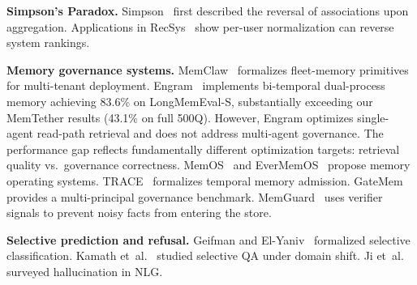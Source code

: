 \documentclass[10pt]{article}
\begin{document}
\textbf{Simpson's Paradox.} Simpson~\citep{simpson1951} first described the reversal of associations upon aggregation. Applications in RecSys~\citep{simpsonrecsys} show per-user normalization can reverse system rankings.

\textbf{Memory governance systems.} MemClaw~\citep{memclaw2026} formalizes fleet-memory primitives for multi-tenant deployment. Engram~\citep{engram2026} implements bi-temporal dual-process memory achieving 83.6\% on LongMemEval-S, substantially exceeding our MemTether results (43.1\% on full 500Q). However, Engram optimizes single-agent read-path retrieval and does not address multi-agent governance. The performance gap reflects fundamentally different optimization targets: retrieval quality vs.\ governance correctness. MemOS~\citep{memos2025} and EverMemOS~\citep{evermemos2026} propose memory operating systems. TRACE~\citep{trace2026} formalizes temporal memory admission. GateMem~\citep{gatemem2026} provides a multi-principal governance benchmark. MemGuard~\citep{memguard2026} uses verifier signals to prevent noisy facts from entering the store.

\textbf{Selective prediction and refusal.} Geifman and El-Yaniv~\citep{geifman2017selective} formalized selective classification. Kamath et~al.~\citep{kamath2020selective} studied selective QA under domain shift. Ji et~al.~\citep{ji2023hallucination} surveyed hallucination in NLG.
\end{document}

